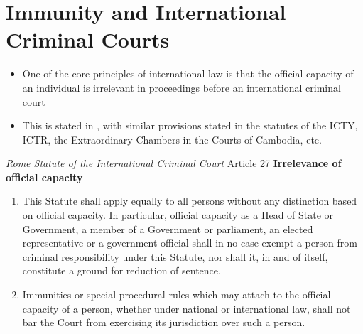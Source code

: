\section{Immunity and International Criminal Courts}
\begin{itemize}
    \item One of the core principles of international law is that the official capacity of an individual is irrelevant in proceedings before an international criminal court
    \item This is stated in , with similar provisions stated in the statutes of the ICTY, ICTR, the Extraordinary Chambers in the Courts of Cambodia, etc.
\end{itemize}

\begin{statutedetails}{\textit{Rome Statute of the International Criminal Court} Article 27}
    \flushleft
    \textbf{Irrelevance of official capacity}
    \begin{enumerate}
        \item This Statute shall apply equally to all persons without any distinction based on official capacity. In particular, official capacity as a Head of State or Government, a member of a Government or parliament, an elected representative or a government official shall in no case exempt a person from criminal responsibility under this Statute, nor shall it, in and of itself, constitute a ground for reduction of sentence. 
        \item Immunities or special procedural rules which may attach to the official capacity of a person, whether under national or international law, shall not bar the Court from exercising its jurisdiction over such a person.
    \end{enumerate}
\end{statutedetails}

